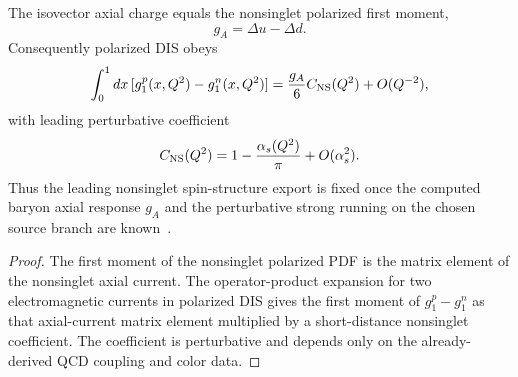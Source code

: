 \documentclass[12pt,a4paper]{article}
\begin{document}
\begin{theorem}
\label{p11:thm:native-bjorken-sum-rule-bridge}
The isovector axial charge equals the nonsinglet polarized first moment,
\begin{equation}
\label{p11:eq:ga-polarized-first-moment}
g_A=\Delta u-\Delta d.
\end{equation}
Consequently polarized DIS obeys
\begin{equation}
\label{p11:eq:bjorken-sum-rule}
\int_0^1dx\,[g_1^p(x,Q^2)-g_1^n(x,Q^2)]
=\frac{g_A}{6}C_{\rm NS}(Q^2)+O(Q^{-2}),
\end{equation}
with leading perturbative coefficient
\begin{equation}
\label{p11:eq:bjorken-coefficient-leading}
C_{\rm NS}(Q^2)=1-\frac{\alpha_s(Q^2)}{\pi}+O(\alpha_s^2).
\end{equation}
Thus the leading nonsinglet spin-structure export is fixed once the computed baryon axial response \(g_A\) and the perturbative strong running on the chosen source branch are known~\cite{Bjorken1966}.
\end{theorem}
\begin{proof}
The first moment of the nonsinglet polarized PDF is the matrix element of the nonsinglet axial current.  The operator-product expansion for two electromagnetic currents in polarized DIS gives the first moment of \(g_1^p-g_1^n\) as that axial-current matrix element multiplied by a short-distance nonsinglet coefficient.  The coefficient is perturbative and depends only on the already-derived QCD coupling and color data.
\end{proof}
\end{document}
